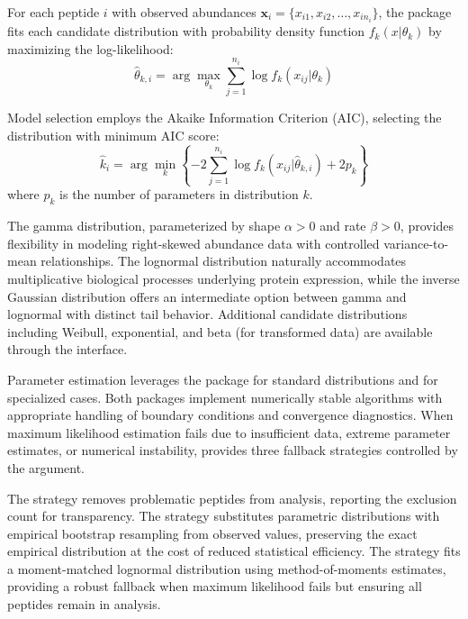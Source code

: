 \documentclass[article]{jss}
\begin{document}
For each peptide $i$ with observed abundances $\mathbf{x}_i = \{x_{i1}, x_{i2}, \ldots, x_{in_i}\}$, the package fits each candidate distribution with probability density function $f_k(x | \theta_k)$ by maximizing the log-likelihood:
\begin{equation}
\hat{\theta}_{k,i} = \arg\max_{\theta_k} \sum_{j=1}^{n_i} \log f_k(x_{ij} | \theta_k)
\end{equation}

Model selection employs the Akaike Information Criterion (AIC), selecting the distribution with minimum AIC score:
\begin{equation}
\hat{k}_i = \arg\min_k \left\{-2 \sum_{j=1}^{n_i} \log f_k(x_{ij} | \hat{\theta}_{k,i}) + 2p_k\right\}
\end{equation}
where $p_k$ is the number of parameters in distribution $k$.

The gamma distribution, parameterized by shape $\alpha > 0$ and rate $\beta > 0$, provides flexibility in modeling right-skewed abundance data with controlled variance-to-mean relationships. The lognormal distribution naturally accommodates multiplicative biological processes underlying protein expression, while the inverse Gaussian distribution offers an intermediate option between gamma and lognormal with distinct tail behavior. Additional candidate distributions including Weibull, exponential, and beta (for transformed data) are available through the  interface.

Parameter estimation leverages the  package for standard distributions and  for specialized cases. Both packages implement numerically stable algorithms with appropriate handling of boundary conditions and convergence diagnostics. When maximum likelihood estimation fails due to insufficient data, extreme parameter estimates, or numerical instability,  provides three fallback strategies controlled by the  argument.

The  strategy removes problematic peptides from analysis, reporting the exclusion count for transparency. The  strategy substitutes parametric distributions with empirical bootstrap resampling from observed values, preserving the exact empirical distribution at the cost of reduced statistical efficiency. The  strategy fits a moment-matched lognormal distribution using method-of-moments estimates, providing a robust fallback when maximum likelihood fails but ensuring all peptides remain in analysis.
\end{document}
